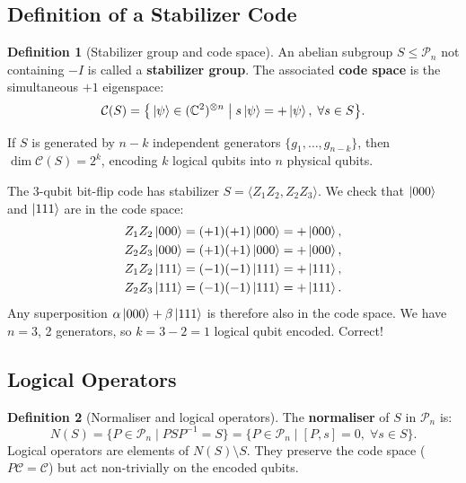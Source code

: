 \documentclass[11pt, a4paper]{article}
\theoremstyle{definition}
\newtheorem{definition}{Definition}[section]
\theoremstyle{plain}
\theoremstyle{remark}
\begin{document}
\subsection{Definition of a Stabilizer Code}

\begin{definition}[Stabilizer group and code space]
An abelian subgroup $S \leq \mathcal{P}_n$ not containing $-I$ is called
a \textbf{stabilizer group}.  The associated \textbf{code space} is the
simultaneous $+1$ eigenspace:
\[
  \mathcal{C}(S)
  = \bigl\{\, \ket{\psi} \in (\mathbb{C}^2)^{\otimes n}
    \;\big|\; s\ket{\psi} = +\ket{\psi},\;\forall s \in S \bigr\}.
\]
\end{definition}

If $S$ is generated by $n-k$ independent generators
$\{g_1, \dots, g_{n-k}\}$, then $\dim \mathcal{C}(S) = 2^k$, encoding
$k$ logical qubits into $n$ physical qubits.

\begin{workedexample}
The 3-qubit bit-flip code has stabilizer $S = \langle Z_1Z_2, Z_2Z_3 \rangle$.
We check that $\ket{000}$ and $\ket{111}$ are in the code space:
\begin{align*}
  Z_1 Z_2 \ket{000} &= (+1)(+1)\ket{000} = +\ket{000}, \\
  Z_2 Z_3 \ket{000} &= (+1)(+1)\ket{000} = +\ket{000}, \\
  Z_1 Z_2 \ket{111} &= (-1)(-1)\ket{111} = +\ket{111}, \\
  Z_2 Z_3 \ket{111} &= (-1)(-1)\ket{111} = +\ket{111}. 
\end{align*}
Any superposition $\alpha\ket{000}+\beta\ket{111}$ is therefore also in the
code space.  We have $n=3$, 2 generators, so $k = 3-2 = 1$ logical qubit
encoded.  Correct!
\end{workedexample}

\subsection{Logical Operators}

\begin{definition}[Normaliser and logical operators]
The \textbf{normaliser} of $S$ in $\mathcal{P}_n$ is:
\[
  N(S) = \{ P \in \mathcal{P}_n \mid PSP^{-1} = S \}
       = \{ P \in \mathcal{P}_n \mid [P, s] = 0,\; \forall s \in S \}.
\]
Logical operators are elements of $N(S) \setminus S$.  They preserve the
code space ($P\mathcal{C} = \mathcal{C}$) but act non-trivially on the
encoded qubits.
\end{definition}
\end{document}
